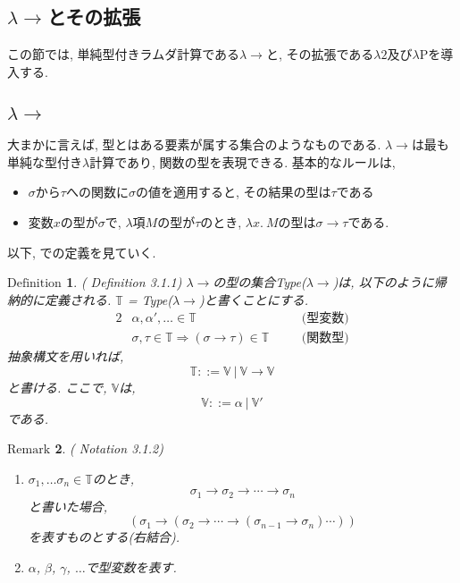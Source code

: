 \documentclass[11pt]{jsreport}
\theoremstyle{mystyle}
\newtheorem{df}{$\textrm{Definition}$}[section]
\newtheorem{rmk}[df]{$\textrm{Remark}$}
\newcommand{\T}{\mathbb{T}}
\newcommand{\V}{\mathbb{V}}
\newcommand{\lama}{\lambda \! \! \to}
\newcommand{\0}{\textbf{0}}
\begin{document}
\subsection{$\lama$とその拡張}
この節では, 単純型付きラムダ計算である$\lama$と, その拡張である$\lambda 2$及び$\lambda$Pを導入する. 
\subsection*{$\lama$}
大まかに言えば, 型とはある要素が属する集合のようなものである. 
$\lama$は最も単純な型付き$\lambda$計算であり, 関数の型を表現できる. 
基本的なルールは, 
\begin{itemize}
  \item $\sigma$から$\tau$への関数に$\sigma$の値を適用すると, 
    その結果の型は$\tau$である
  \item
    変数$x$の型が$\sigma$で, $\lambda$項$M$の型が$\tau$のとき, 
    $\lambda x.\ M$の型は$\sigma \to \tau$である. 
\end{itemize}
以下, \cite{Bar}での定義を見ていく. 
\begin{shadebox}
  \begin{df}{(\cite{Bar} Definition 3.1.1)}
    $\lama$の型の集合Type($\lama$)は, 以下のように帰納的に定義される. 
    $\T$ = Type($\lama$)と書くことにする. 
    \begin{alignat*}{2}
      &\alpha, \alpha',\ldots \in \T& &\text{(型変数)}\\
      &\sigma, \tau \in \T \Rightarrow (\sigma \to \tau) \in \T&  \quad &\text{(関数型)}
    \end{alignat*}
    抽象構文を用いれば, 
    \[
      \T ::= \V \ |\ \V \to \V
    \]
    と書ける. ここで, $\V$は, 
    \[
      \V ::= \alpha \ | \ \V'
    \]
    である.
  \end{df}
\end{shadebox}
\begin{rmk}{(\cite{Bar} Notation 3.1.2)}
  \begin{enumerate}
    \item $\sigma_{1}, \ldots \sigma_{n} \in \T$のとき, 
      \[
        \sigma_1 \to \sigma_2 \to \cdots \to \sigma_n
      \]
      と書いた場合, 
      \[
        (\sigma_1 \to (\sigma_2 \to \cdots \to (\sigma_{n-1} \to \sigma_n) \cdots ))
      \]
      を表すものとする(右結合).
    \item $\alpha$, $\beta$, $\gamma$, $\ldots$で型変数を表す. 
  \end{enumerate}
\end{rmk}
\end{document}
